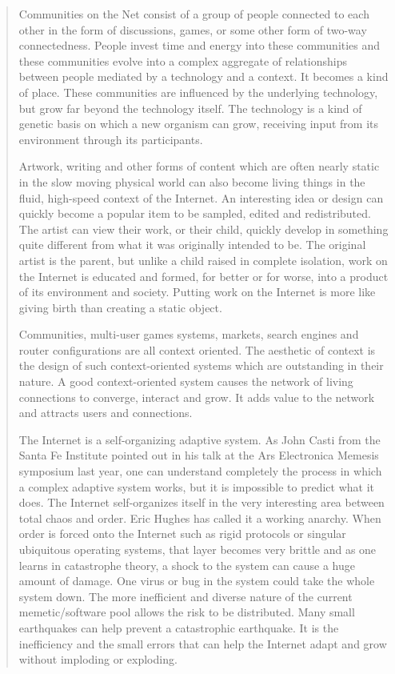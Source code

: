 \begin{quote}
Communities on the Net consist of a group of people connected to each other in the form of discussions, games, or some other form of two-way connectedness. People invest time and energy into these communities and these communities evolve into a complex aggregate of relationships between people mediated by a technology and a context. It becomes a kind of place. These communities are influenced by the underlying technology, but grow far beyond the technology itself. The technology is a kind of genetic basis on which a new organism can grow, receiving input from its environment through its participants.

Artwork, writing and other forms of content which are often nearly static in the slow moving physical world can also become living things in the fluid, high-speed context of the Internet. An interesting idea or design can quickly become a popular item to be sampled, edited and redistributed. The artist can view their work, or their child, quickly develop in something quite different from what it was originally intended to be. The original artist is the parent, but unlike a child raised in complete isolation, work on the Internet is educated and formed, for better or for worse, into a product of its environment and society. Putting work on the Internet is more like giving birth than creating a static object.

Communities, multi-user games systems, markets, search engines and router configurations are all context oriented. The aesthetic of context is the design of such context-oriented systems which are outstanding in their nature. A good context-oriented system causes the network of living connections to converge, interact and grow. It adds value to the network and attracts users and connections.

The Internet is a self-organizing adaptive system. As John Casti from the Santa Fe Institute pointed out in his talk at the Ars Electronica Memesis symposium last year, one can understand completely the process in which a complex adaptive system works, but it is impossible to predict what it does. The Internet self-organizes itself in the very interesting area between total chaos and order. Eric Hughes has called it a working anarchy. When order is forced onto the Internet such as rigid protocols or singular ubiquitous operating systems, that layer becomes very brittle and as one learns in catastrophe theory, a shock to the system can cause a huge amount of damage. One virus or bug in the system could take the whole system down. The more inefficient and diverse nature of the current memetic/software pool allows the risk to be distributed. Many small earthquakes can help prevent a catastrophic earthquake. It is the inefficiency and the small errors that can help the Internet adapt and grow without imploding or exploding.


\end{quote}
